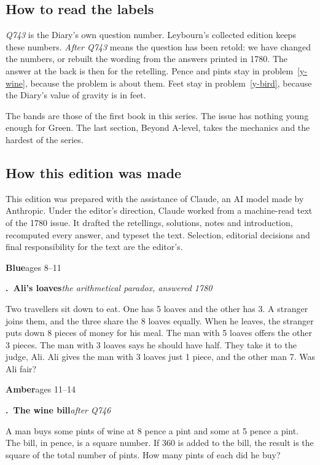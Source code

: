 \documentclass[11pt,a4paper]{article}
\newcounter{prob}
\newcommand{\prob}[3]{\par\bigskip\refstepcounter{prob}\label{#1}%
  \noindent\textbf{\theprob.\ #2}\hfill{\small\textit{#3}}\par\nopagebreak\smallskip}
\newcommand{\band}[3]{%
  \clearpage
  \begin{tcolorbox}[colback=#1!12,colframe=#1,boxrule=1pt,arc=2pt]
  {\Large\bfseries\color{#1} #2}\hfill{\large #3}
  \end{tcolorbox}}
\begin{document}
\subsection*{How to read the labels}

\textit{Q743} is the Diary's own question number. Leybourn's collected edition keeps
these numbers. \textit{After Q743} means the question has been retold: we have changed the
numbers, or rebuilt the wording from the answers printed in 1780. The answer at the back
is then for the retelling. Pence and pints stay in problem~\ref{y-wine}, because the
problem is about them. Feet stay in problem~\ref{y-bird}, because the Diary's value of
gravity is in feet.

The bands are those of the first book in this series. The issue has nothing young
enough for Green. The last section, Beyond A-level, takes the mechanics and the hardest
of the series.

\subsection*{How this edition was made}
This edition was prepared with the assistance of Claude, an AI model made by Anthropic.
Under the editor's direction, Claude worked from a machine-read text of the 1780 issue.
It drafted the retellings, solutions, notes and introduction, recomputed every answer,
and typeset the text. Selection, editorial decisions and final responsibility for the
text are the editor's.

\band{bandblue}{Blue}{ages 8--11}

\prob{y-loaves}{Ali's loaves}{the arithmetical paradox, answered 1780}
Two travellers sit down to eat. One has 5 loaves and the other has 3. A stranger joins
them, and the three share the 8 loaves equally. When he leaves, the stranger puts down 8
pieces of money for his meal. The man with 5 loaves offers the other 3 pieces. The man
with 3 loaves says he should have half. They take it to the judge, Ali. Ali gives the
man with 3 loaves just 1 piece, and the other man 7. Was Ali fair?

\band{bandamber}{Amber}{ages 11--14}

\prob{y-wine}{The wine bill}{after Q746}
A man buys some pints of wine at 8 pence a pint and some at 5 pence a pint. The bill, in
pence, is a square number. If 360 is added to the bill, the result is the square of the
total number of pints. How many pints of each did he buy?
\end{document}
